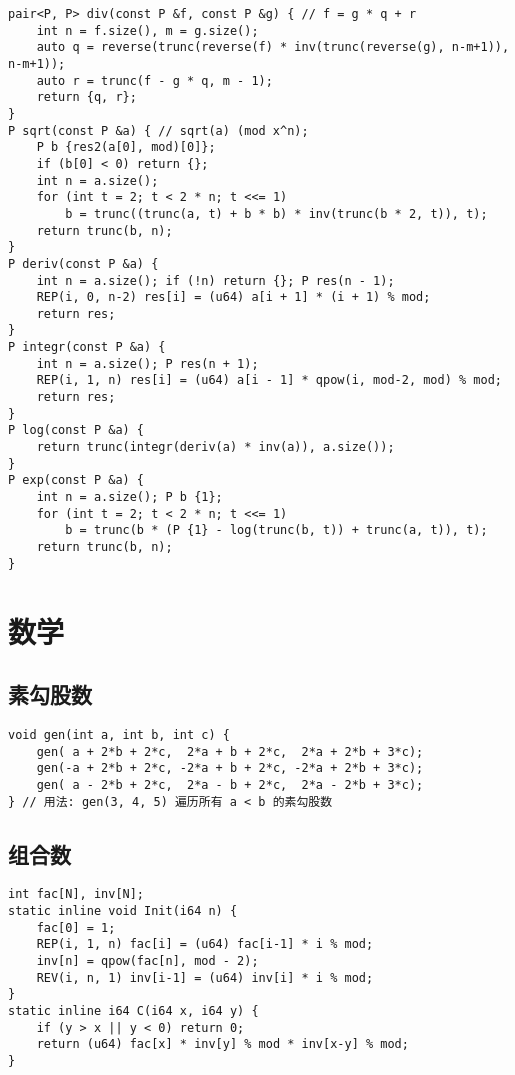 \documentclass[a4paper,landscape,twocolumn]{ctexart}
\begin{document}
\begin{lstlisting}[]
pair<P, P> div(const P &f, const P &g) { // f = g * q + r
	int n = f.size(), m = g.size();
	auto q = reverse(trunc(reverse(f) * inv(trunc(reverse(g), n-m+1)), n-m+1));
	auto r = trunc(f - g * q, m - 1);
	return {q, r};
}
P sqrt(const P &a) { // sqrt(a) (mod x^n);
	P b {res2(a[0], mod)[0]};
	if (b[0] < 0) return {};
	int n = a.size();
	for (int t = 2; t < 2 * n; t <<= 1)
		b = trunc((trunc(a, t) + b * b) * inv(trunc(b * 2, t)), t);
	return trunc(b, n);
}
P deriv(const P &a) {
	int n = a.size(); if (!n) return {}; P res(n - 1);
	REP(i, 0, n-2) res[i] = (u64) a[i + 1] * (i + 1) % mod;
	return res;
}
P integr(const P &a) {
	int n = a.size(); P res(n + 1);
	REP(i, 1, n) res[i] = (u64) a[i - 1] * qpow(i, mod-2, mod) % mod;
	return res;
}
P log(const P &a) {
	return trunc(integr(deriv(a) * inv(a)), a.size());
}
P exp(const P &a) {
	int n = a.size(); P b {1};
	for (int t = 2; t < 2 * n; t <<= 1)
		b = trunc(b * (P {1} - log(trunc(b, t)) + trunc(a, t)), t);
	return trunc(b, n);
}
\end{lstlisting}

\section{数学}

\subsection{素勾股数}

\begin{lstlisting}
void gen(int a, int b, int c) {
    gen( a + 2*b + 2*c,  2*a + b + 2*c,  2*a + 2*b + 3*c);
    gen(-a + 2*b + 2*c, -2*a + b + 2*c, -2*a + 2*b + 3*c);
    gen( a - 2*b + 2*c,  2*a - b + 2*c,  2*a - 2*b + 3*c);
} // 用法: gen(3, 4, 5) 遍历所有 a < b 的素勾股数
\end{lstlisting}

\subsection{组合数}

\begin{lstlisting}
int fac[N], inv[N];
static inline void Init(i64 n) {
	fac[0] = 1;
	REP(i, 1, n) fac[i] = (u64) fac[i-1] * i % mod;
	inv[n] = qpow(fac[n], mod - 2);
	REV(i, n, 1) inv[i-1] = (u64) inv[i] * i % mod;
}
static inline i64 C(i64 x, i64 y) {
	if (y > x || y < 0) return 0;
	return (u64) fac[x] * inv[y] % mod * inv[x-y] % mod;
}
\end{lstlisting}
\end{document}
